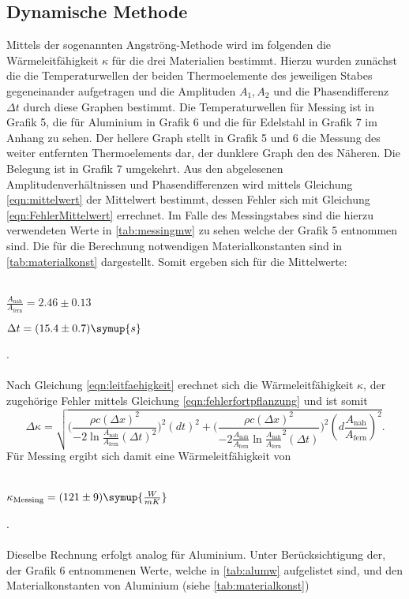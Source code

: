 \subsection{Dynamische Methode}
Mittels der sogenannten Angströng-Methode wird im folgenden die Wärmeleitfähigkeit $\kappa$ für die drei Materialien bestimmt.
Hierzu wurden zunächst die die Temperaturwellen der beiden Thermoelemente des jeweiligen Stabes gegeneinander aufgetragen und die Amplituden $A_1,A_2$ und die Phasendifferenz $\Delta t$ durch diese Graphen bestimmt.
Die Temperaturwellen für Messing ist in Grafik 5, die für Aluminium in Grafik 6 und die für Edelstahl in Grafik 7 im Anhang zu sehen. Der hellere Graph stellt in Grafik 5 und 6
die Messung des weiter entfernten Thermoelements dar, der dunklere Graph den des Näheren. Die Belegung ist in Grafik 7 umgekehrt.
Aus den abgelesenen Amplitudenverhältnissen und Phasendifferenzen wird mittels Gleichung \eqref{eqn:mittelwert} der Mittelwert bestimmt, dessen Fehler sich mit Gleichung \eqref{eqn:FehlerMittelwert} errechnet.
Im Falle des Messingstabes sind die hierzu verwendeten Werte in \autoref{tab:messingmw} zu sehen welche der Grafik 5 entnommen sind.
Die für die Berechnung notwendigen Materialkonstanten sind in \autoref{tab:materialkonst} dargestellt.
Somit ergeben sich für die Mittelwerte:
\\ \\
\centerline{$\frac{A_\text{nah}}{A_\text{fern}} = 2.46 \pm 0.13$}
\centerline{$\Delta t = (15.4 \pm 0.7) \symup{s}$}.
\\ \\
Nach Gleichung \eqref{eqn:leitfaehigkeit} erechnet sich die Wärmeleitfähigkeit $\kappa$, der zugehörige Fehler mittels Gleichung \eqref{eqn:fehlerfortpflanzung}
und ist somit 
\begin{equation}
\label{eqn:fehlerkappa}
\Delta \kappa = \sqrt{\biggl (\frac{\rho c (\Delta x)^2}{-2 \ln{\frac{A_\text{nah}}{A_\text{fern}}} (\Delta t)^2 }\biggr)^2(dt)^2 + \biggl(\frac{\rho c (\Delta x)^2}{-2 \frac{A_\text{nah}}{A_\text{fern}} \ln{\frac{A_\text{nah}}{A_\text{fern}}}^2 (\Delta t)} \biggr )^2 (d\frac{A_\text{nah}}{A_\text{fern}})^2 }.
\end{equation}
Für Messing ergibt sich damit eine Wärmeleitfähigkeit von
\\ \\
\centerline{$\kappa_\text{Messing} = (121 \pm 9) \symup{\frac{W}{mK}}$}.
\\ \\
Dieselbe Rechnung erfolgt analog für Aluminium.
Unter Berücksichtigung der, der Grafik 6 entnommenen Werte, welche in \autoref{tab:alumw} aufgelistet sind, und den Materialkonstanten von Aluminium (siehe \autoref{tab:materialkonst})
